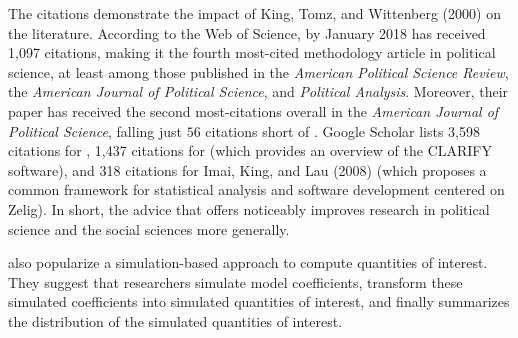 \documentclass[11pt]{article}
\begin{document}
The citations demonstrate the impact of King, Tomz, and Wittenberg (2000) on the literature.
According to the Web of Science, by January 2018 \cite{KingTomzWittenberg2000} has received 1,097 citations, making it the fourth most-cited methodology article in political science, at least among those published in the \textit{American Political Science Review}, the \textit{American Journal of Political Science}, and \textit{Political Analysis}.
Moreover, their paper has received the second most-citations overall in the \textit{American Journal of Political Science}, falling just $56$ citations short of \cite{BeckKatzTucker1998}.
Google Scholar lists 3,598 citations for \cite{KingTomzWittenberg2000}, 1,437 citations for \cite{TomzWittenbergKing2003} (which provides an overview of the CLARIFY software), and 318 citations for Imai, King, and Lau (2008) (which proposes a common framework for statistical analysis and software development centered on Zelig).
In short, the advice that \cite{KingTomzWittenberg2000} offers noticeably improves research in political science and the social sciences more generally.





\cite{KingTomzWittenberg2000} also popularize a simulation-based approach to compute quantities of interest.
They suggest that researchers simulate model coefficients, transform these simulated coefficients into simulated quantities of interest, and finally summarizes the distribution of the simulated quantities of interest.
\end{document}
